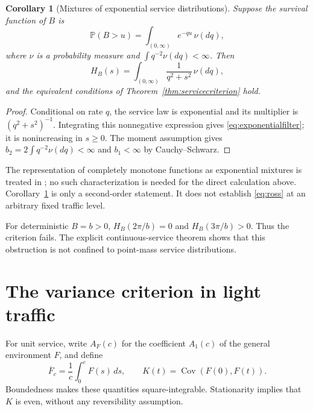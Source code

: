 \documentclass[aap,preprint]{imsart}
\numberwithin{equation}{section}
\theoremstyle{plain}
\newtheorem{corollary}[theorem]{Corollary}
\theoremstyle{definition}
\newcommand{\Pp}{\mathbb P}
\newcommand{\1}{\mathbf 1}
\DeclareMathOperator{\Cov}{Cov}
\begin{document}
\begin{corollary}[Mixtures of exponential service distributions]\label{cor:exponential}
Suppose the survival function of $B$ is
\[
 \Pp(B>u)=\int_{(0,\infty)}e^{-qu}\,\nu(dq),
\]
where $\nu$ is a probability measure and $\int q^{-2}\nu(dq)<\infty$. Then
\begin{equation}\label{eq:exponentialfilter}
 H_B(s)=\int_{(0,\infty)}\frac{1}{q^2+s^2}\,\nu(dq),
\end{equation}
and the equivalent conditions of Theorem~\ref{thm:servicecriterion} hold.
\end{corollary}
\begin{proof}
Conditional on rate $q$, the service law is exponential and its multiplier is $(q^2+s^2)^{-1}$. Integrating this nonnegative expression gives \eqref{eq:exponentialfilter}; it is nonincreasing in $s\ge0$. The moment assumption gives $b_2=2\int q^{-2}\nu(dq)<\infty$ and $b_1<\infty$ by Cauchy--Schwarz.
\end{proof}
The representation of completely monotone functions as exponential mixtures is treated in \cite{SSV12}; no such characterization is needed for the direct calculation above. Corollary~\ref{cor:exponential} is only a second-order statement. It does not establish \eqref{eq:ross} at an arbitrary fixed traffic level.

For deterministic $B=b>0$, $H_B(2\pi/b)=0$ and $H_B(3\pi/b)>0$. Thus the criterion fails. The explicit continuous-service theorem shows that this obstruction is not confined to point-mass service distributions.

\section{The variance criterion in light traffic}\label{sec:variance}
For unit service, write $A_F(c)$ for the coefficient $A_1(c)$ of the general environment $F$, and define
\begin{equation}\label{eq:average}
 \overline F_c=\frac1c\int_0^c F(s)\,ds,
 \qquad K(t)=\Cov(F(0),F(t)).
\end{equation}
Boundedness makes these quantities square-integrable. Stationarity implies that $K$ is even, without any reversibility assumption.
\end{document}
